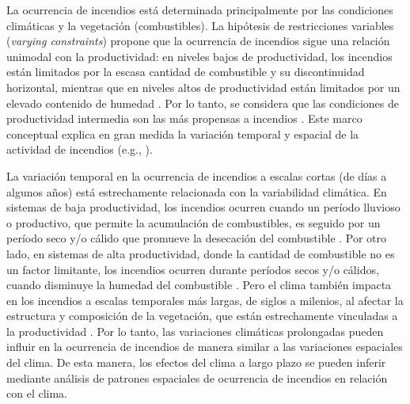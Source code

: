 La ocurrencia de incendios está determinada principalmente por las condiciones climáticas y la vegetación (combustibles). La hipótesis de restricciones variables (\textit{varying constraints}) propone que la ocurrencia de incendios sigue una relación unimodal con la productividad: en niveles bajos de productividad, los incendios están limitados por la escasa cantidad de combustible y su discontinuidad horizontal, mientras que en niveles altos de productividad están limitados por un elevado contenido de humedad \citep{krawchuk_global_2009, krawchuk_constraints_2011}. Por lo tanto, se considera que las condiciones de productividad intermedia son las más propensas a incendios \citep{pausas2012fuel, pausas_global_2013}. Este marco conceptual explica en gran medida la variación temporal y espacial de la actividad de incendios (e.g., \citealt{pricope2012spatio, fischer2015influence, kitzberger_projections_2022}).

La variación temporal en la ocurrencia de incendios a escalas cortas (de días a algunos años) está estrechamente relacionada con la variabilidad climática. En sistemas de baja productividad, los incendios ocurren cuando un período lluvioso o productivo, que permite la acumulación de combustibles, es seguido por un período seco y/o cálido que promueve la desecación del combustible \citep{kitzberger_climatic_1997, villagra_spatial_2024}. Por otro lado, en sistemas de alta productividad, donde la cantidad de combustible no es un factor limitante, los incendios ocurren durante períodos secos y/o cálidos, cuando disminuye la humedad del combustible \citep{sommerfeld_patterns_2018, gaboriau_drivers_2022, cawson_atmospheric_2024}. Pero el clima también impacta en los incendios a escalas temporales más largas, de siglos a milenios, al afectar la estructura y composición de la vegetación, que están estrechamente vinculadas a la productividad \citep{woodward_vegetation_1991, box_vegetation_2013}. Por lo tanto, las variaciones climáticas prolongadas pueden influir en la ocurrencia de incendios de manera similar a las variaciones espaciales del clima. De esta manera, los efectos del clima a largo plazo se pueden inferir mediante análisis de patrones espaciales de ocurrencia de incendios en relación con el clima.

